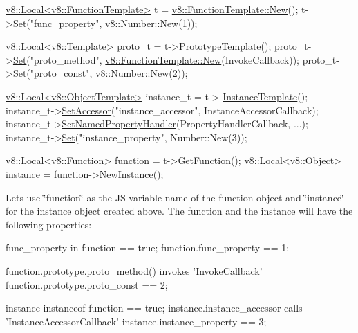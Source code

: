 \begin{DoxyCode}
\hyperlink{classv8_1_1_local}{v8::Local<v8::FunctionTemplate>} t = 
      \hyperlink{classv8_1_1_function_template_af9012aee4a102c4018fec8e9532cb996}{v8::FunctionTemplate::New}();
t->\hyperlink{classv8_1_1_template_a8a29557db5d0bc980752084b925a9b01}{Set}(\textcolor{stringliteral}{"func\_property"}, v8::Number::New(1));

\hyperlink{classv8_1_1_local}{v8::Local<v8::Template>} proto\_t = t->\hyperlink{classv8_1_1_function_template_aa2bcc2652b5f0fdbc666d943ccf72021}{PrototypeTemplate}();
proto\_t->\hyperlink{classv8_1_1_template_a8a29557db5d0bc980752084b925a9b01}{Set}(\textcolor{stringliteral}{"proto\_method"}, \hyperlink{classv8_1_1_function_template_af9012aee4a102c4018fec8e9532cb996}{v8::FunctionTemplate::New}(InvokeCallback));
proto\_t->\hyperlink{classv8_1_1_template_a8a29557db5d0bc980752084b925a9b01}{Set}(\textcolor{stringliteral}{"proto\_const"}, v8::Number::New(2));

\hyperlink{classv8_1_1_local}{v8::Local<v8::ObjectTemplate>} instance\_t = t->
      \hyperlink{classv8_1_1_function_template_a00dd9725566908e8fd14064542f5a781}{InstanceTemplate}();
instance\_t->\hyperlink{classv8_1_1_object_template_a944ce96b6b65d571f8d682407b70d484}{SetAccessor}(\textcolor{stringliteral}{"instance\_accessor"}, InstanceAccessorCallback);
instance\_t->\hyperlink{classv8_1_1_object_template_aa80e9db593d8b954c4153082dc7a439d}{SetNamedPropertyHandler}(PropertyHandlerCallback, ...);
instance\_t->\hyperlink{classv8_1_1_template_a8a29557db5d0bc980752084b925a9b01}{Set}(\textcolor{stringliteral}{"instance\_property"}, Number::New(3));

\hyperlink{classv8_1_1_local}{v8::Local<v8::Function>} \textcolor{keyword}{function} = t->\hyperlink{classv8_1_1_function_template_a3b8e5e214b2ee34c36138961ebac696a}{GetFunction}();
\hyperlink{classv8_1_1_local}{v8::Local<v8::Object>} instance = \textcolor{keyword}{function}->NewInstance();
\end{DoxyCode}


Let\textquotesingle{}s use \char`\"{}function\char`\"{} as the J\+S variable name of the function object and \char`\"{}instance\char`\"{} for the instance object created above. The function and the instance will have the following properties\+:


\begin{DoxyCode}
func\_property in \textcolor{keyword}{function} == \textcolor{keyword}{true};
\textcolor{keyword}{function}.func\_property == 1;

\textcolor{keyword}{function}.prototype.proto\_method() invokes \textcolor{stringliteral}{'InvokeCallback'}
\textcolor{keyword}{function}.prototype.proto\_const == 2;

instance instanceof \textcolor{keyword}{function} == \textcolor{keyword}{true};
instance.instance\_accessor calls \textcolor{stringliteral}{'InstanceAccessorCallback'}
instance.instance\_property == 3;
\end{DoxyCode}


